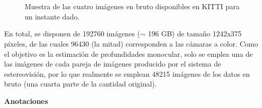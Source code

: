\begin{figure}[H]
\centering
\hfil
	\\[-2ex]

\hfil
	\\[-2ex]
	
\caption{Muestra de las cuatro imágenes en bruto disponibles en KITTI para un instante dado.}
\label{fig:kitti-raw}
\end{figure}

En total, se disponen de 192760 imágenes ($\sim$ 196 GB) de tamaño 1242x375 píxeles, de las cuales 96430 (la mitad) corresponden a las cámaras a color. Como el objetivo es la estimación de profundidades monocular, solo se emplea una de las imágenes de cada pareja de imágenes producido por el sistema de estereovisión, por lo que realmente se emplean 48215 imágenes de los datos en bruto (una cuarta parte de la cantidad original).

\textbf{Anotaciones}

